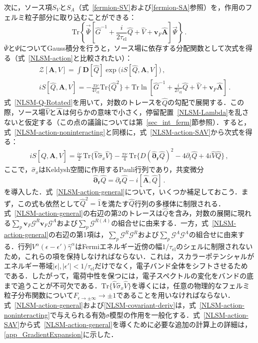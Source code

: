 \documentclass[a4paper,11pt]{ltjsarticle}
\def\Tr{\mathrm{Tr}}
\def\D{\mathbf{D}}
\def\tauel{\tau_{\mathrm{el}}}
\begin{document}
次に，ソース項$S_{V}$と$S_{A}$（式~\eqref{fermion-SV}および\eqref{fermion-SA}参照）を，作用のフェルミ粒子部分に取り込むことができる：
$$\Tr\left\{\vec{\bar{\Psi}}\left[\hat{G}^{-1}+\frac{i}{2\tauel}\hat{Q}+
\hat{V}+\mathbf{v}_{F}\hat{\mathbf{A}}\right]\vec{\Psi}\right\}\,.$$
$\bar{\Psi}$と$\Psi$についてGauss積分を行うと，ソース場に依存する分配関数として次式を得る（式~\eqref{NLSM-action}と比較されたい）：
\begin{eqnarray}\label{NLSM-action-SAV}
&&\mathcal{Z}[\mathbf{A},V]=\int\D[\hat Q]
\exp\big(iS[\hat Q,\mathbf{A},V]\big)\,,\nonumber\\
&& iS[\hat
Q,\mathbf{A},V]=-\frac{\pi\nu}{4\tauel}\Tr\{\hat{Q}^{2}\}+
\Tr\ln\left[\hat{G}^{-1}+\frac{i}{2\tauel}\hat{Q}+
\hat{V}+\mathbf{v}_{F}\hat{\mathbf{A}}\right]\,.
\end{eqnarray}
式~\eqref{NLSM-Q-Rotated}を用いて，対数のトレースを$\hat{Q}$の勾配で展開する．この際，ソース場$\hat{V}$と$\hat{\mathbf{A}}$は何らかの意味で小さく，停留配置~\eqref{NLSM-Lambda}を乱さないと仮定する（この点の議論については第~\ref{sec_int_ferm}節参照）．すると，式~\eqref{NLSM-action-noninteracting}と同様に，式~\eqref{NLSM-action-SAV}から次式を得る：
\begin{eqnarray}\label{NLSM-action-general}
iS[\hat Q,\mathbf{A},V]=\frac{i\nu}{2}\, \Tr\big\{\hat{V}\hat{\sigma}_{x}\hat{V}\big\}
-\frac{\pi\nu}{4}\, \Tr\Big\{D(\hat{\bm{\partial}}_{\mathbf{r}}\hat{Q})^{2}-
4\partial_{t}\hat{Q}+4i\hat{V}\hat{Q}\Big\}\,,
\end{eqnarray}
ここで，$\hat{\sigma}_{x}$はKeldysh空間に作用するPauli行列であり，共変微分
\begin{equation}\label{NLSM-covariant-deriv}
\hat{\bm{\partial}}_{\mathbf{r}}\hat{Q}=
\partial_{\mathbf{r}}\hat{Q}-i[\hat{\mathbf{A}},\hat{Q}]\,.
\end{equation}
を導入した．式~\eqref{NLSM-action-general}について，いくつか補足しておこう．まず，この式も依然として$\hat{Q}^{2}=\hat{1}$を満たす$\hat{Q}$行列の多様体に制限される．式~\eqref{NLSM-action-general}の右辺の第2のトレースは$\hat{Q}$を含み，対数の展開に現れる$\sum_{p}\mathbf{v}_{F}\mathcal{G}^{R}\mathbf{v}_{F}\mathcal{G}^{A}$および$\sum_{p}\mathcal{G}^{R(A)}$の組合せに由来する．一方，式~\eqref{NLSM-action-general}の右辺の第1項は，$\sum_{p}\mathcal{G}^{R}\mathcal{G}^{R}$および$\sum_{p}\mathcal{G}^{A}\mathcal{G}^{A}$の組合せに由来する．行列$V^{\alpha}(\epsilon-\epsilon')\hat{\gamma}^{\alpha}$はFermiエネルギー近傍の幅$1/\tauel$のシェルに制限されないため，これらの項を保持しなければならない．これは，スカラーポテンシャルがエネルギー帯域$|\epsilon|,|\epsilon'|<1/\tauel$だけでなく，電子バンド全体をシフトさせるためである．したがって，電荷中性を保つには，電子スペクトルの変化をバンドの底まで追うことが不可欠である．$\Tr\{\hat{V}\hat{\sigma}_{x}\hat{V}\}$を導くには，任意の物理的なフェルミ粒子分布関数について$F_{\epsilon\to\pm\infty}\to\pm1$であることを用いなければならない．式~\eqref{NLSM-action-general}および\eqref{NLSM-covariant-deriv}は，式~\eqref{NLSM-action-noninteracting}で与えられる有効$\sigma$模型の作用を一般化する．式~\eqref{NLSM-action-SAV}から式~\eqref{NLSM-action-general}を導くために必要な追加の計算上の詳細は，\ref{app_GradientExpansion}に示した．
\end{document}
